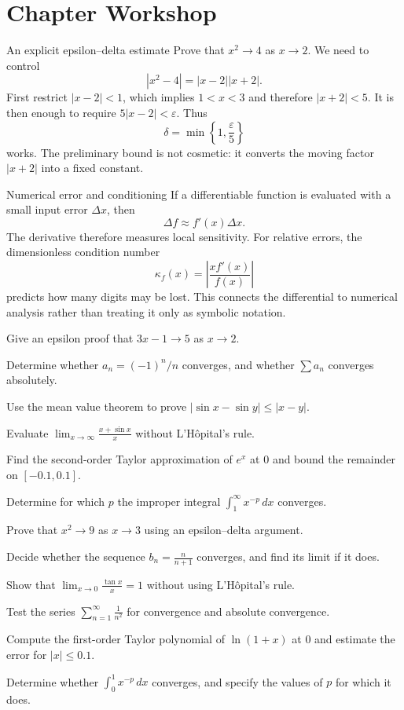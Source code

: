 \section{Chapter Workshop}

\begin{workedexample}{An explicit epsilon--delta estimate}
Prove that $x^2\to4$ as $x\to2$. We need to control
\[
    |x^2-4|=|x-2||x+2|.
\]
First restrict $|x-2|<1$, which implies $1<x<3$ and therefore $|x+2|<5$. It is then enough to require $5|x-2|<\varepsilon$. Thus
\[
    \delta=\min\left\{1,\frac{\varepsilon}{5}\right\}
\]
works. The preliminary bound is not cosmetic: it converts the moving factor $|x+2|$ into a fixed constant.
\end{workedexample}

\begin{applicationbox}{Numerical error and conditioning}
If a differentiable function is evaluated with a small input error $\Delta x$, then
\[
    \Delta f\approx f'(x)\Delta x.
\]
The derivative therefore measures local sensitivity. For relative errors, the dimensionless condition number
\[
    \kappa_f(x)=\left|\frac{x f'(x)}{f(x)}\right|
\]
predicts how many digits may be lost. This connects the differential to numerical analysis rather than treating it only as symbolic notation.
\end{applicationbox}

\begin{chapterexercises}
    \item Give an epsilon proof that $3x-1\to5$ as $x\to2$.
    \item Determine whether $a_n=(-1)^n/n$ converges, and whether $\sum a_n$ converges absolutely.
    \item Use the mean value theorem to prove $|\sin x-\sin y|\le|x-y|$.
    \item Evaluate $\displaystyle\lim_{x\to\infty}\frac{x+\sin x}{x}$ without L'Hôpital's rule.
    \item Find the second-order Taylor approximation of $e^x$ at $0$ and bound the remainder on $[-0.1,0.1]$.
    \item Determine for which $p$ the improper integral $\displaystyle\int_1^\infty x^{-p}\,dx$ converges.
    \item Prove that $x^2\to9$ as $x\to3$ using an epsilon--delta argument.
    \item Decide whether the sequence $b_n=\frac{n}{n+1}$ converges, and find its limit if it does.
    \item Show that $\displaystyle\lim_{x\to0}\frac{\tan x}{x}=1$ without using L'Hôpital's rule.
    \item Test the series $\displaystyle\sum_{n=1}^\infty \frac{1}{n^2}$ for convergence and absolute convergence.
    \item Compute the first-order Taylor polynomial of $\ln(1+x)$ at $0$ and estimate the error for $|x|\le0.1$.
    \item Determine whether $\displaystyle\int_0^1 x^{-p}\,dx$ converges, and specify the values of $p$ for which it does.
\end{chapterexercises}

